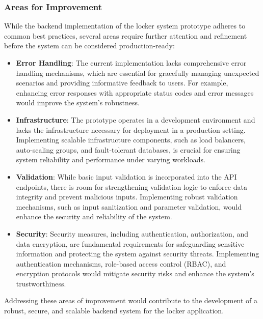 \subsubsection{Areas for Improvement}

While the backend implementation of the locker system prototype adheres to common best practices, several areas require further attention and refinement before the system can be considered production-ready:

\begin{itemize}
    \item \textbf{Error Handling}: The current implementation lacks comprehensive error handling mechanisms, which are essential for gracefully managing unexpected scenarios and providing informative feedback to users. For example, enhancing error responses with appropriate status codes and error messages would improve the system's robustness.

    \item \textbf{Infrastructure}: The prototype operates in a development environment and lacks the infrastructure necessary for deployment in a production setting. Implementing scalable infrastructure components, such as load balancers, auto-scaling groups, and fault-tolerant databases, is crucial for ensuring system reliability and performance under varying workloads.

    \item \textbf{Validation}: While basic input validation is incorporated into the API endpoints, there is room for strengthening validation logic to enforce data integrity and prevent malicious inputs. Implementing robust validation mechanisms, such as input sanitization and parameter validation, would enhance the security and reliability of the system.

    \item \textbf{Security}: Security measures, including authentication, authorization, and data encryption, are fundamental requirements for safeguarding sensitive information and protecting the system against security threats. Implementing authentication mechanisms, role-based access control (RBAC), and encryption protocols would mitigate security risks and enhance the system's trustworthiness.
\end{itemize}

Addressing these areas of improvement would contribute to the development of a robust, secure, and scalable backend system for the locker application.

